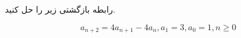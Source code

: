 \EXERCISE
رابطه بازگشتی زیر را حل کنید.

$$a_{n+2} = 4a_{n+1} - 4a_{n}, a_1 = 3, a_0 = 1, n \geq 0$$